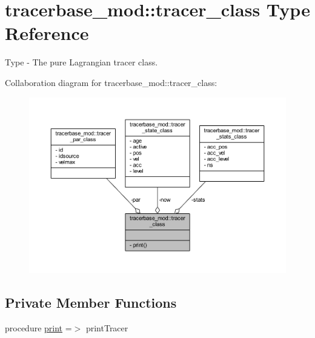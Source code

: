\hypertarget{structtracerbase__mod_1_1tracer__class}{}\section{tracerbase\+\_\+mod\+:\+:tracer\+\_\+class Type Reference}
\label{structtracerbase__mod_1_1tracer__class}


Type -\/ The pure Lagrangian tracer class.  




Collaboration diagram for tracerbase\+\_\+mod\+:\+:tracer\+\_\+class\+:\nopagebreak
\begin{figure}[H]
\begin{center}
\leavevmode
\includegraphics[width=350pt]{structtracerbase__mod_1_1tracer__class__coll__graph}
\end{center}
\end{figure}
\subsection*{Private Member Functions}
\begin{DoxyCompactItemize}
\item 
procedure \mbox{\hyperlink{structtracerbase__mod_1_1tracer__class_a1142993acbb67b4fe43c52b554165e71}{print}} =$>$ print\+Tracer
\end{DoxyCompactItemize}
